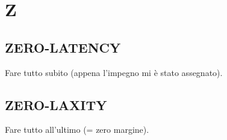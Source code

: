 \newpage
	\section{Z} \label{sec:Z}
	
		\subsection{ZERO-LATENCY}  \label{zero-latency}
		Fare tutto subito (appena l'impegno mi è stato assegnato).
		
		\subsection{ZERO-LAXITY}  \label{zero-laxity}
		Fare tutto all'ultimo (= zero margine).


